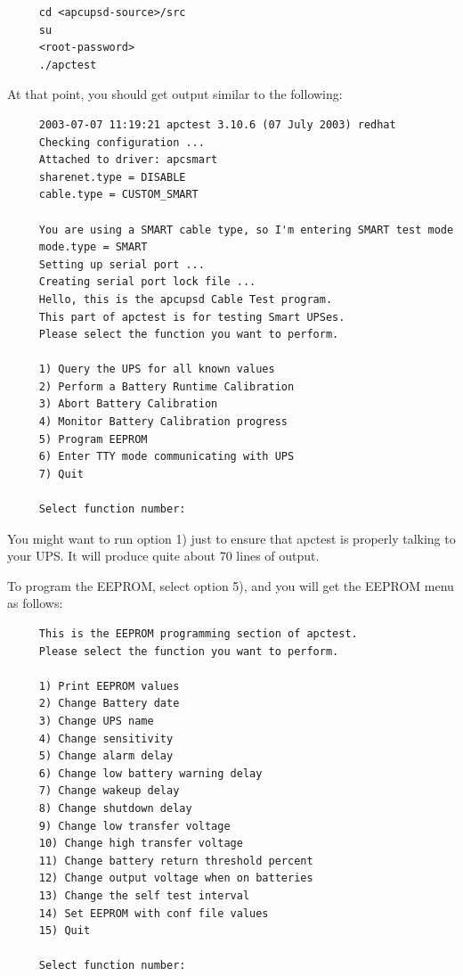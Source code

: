 {{{{{{\footnotesize
\begin{verbatim}
     cd <apcupsd-source>/src
     su
     <root-password>
     ./apctest
\end{verbatim}
\normalsize

At that point, you should get output similar to the following: 

\footnotesize
\begin{verbatim}
     2003-07-07 11:19:21 apctest 3.10.6 (07 July 2003) redhat
     Checking configuration ...
     Attached to driver: apcsmart
     sharenet.type = DISABLE
     cable.type = CUSTOM_SMART
     
     You are using a SMART cable type, so I'm entering SMART test mode
     mode.type = SMART
     Setting up serial port ...
     Creating serial port lock file ...
     Hello, this is the apcupsd Cable Test program.
     This part of apctest is for testing Smart UPSes.
     Please select the function you want to perform.
     
     1) Query the UPS for all known values
     2) Perform a Battery Runtime Calibration
     3) Abort Battery Calibration
     4) Monitor Battery Calibration progress
     5) Program EEPROM
     6) Enter TTY mode communicating with UPS
     7) Quit
     
     Select function number:
\end{verbatim}
\normalsize

You might want to run option 1) just to ensure that apctest is properly
talking to your UPS. It will produce quite about 70 lines of output.  

To program the EEPROM, select option 5), and you will get the EEPROM menu as
follows: 

\footnotesize
\begin{verbatim}
     This is the EEPROM programming section of apctest.
     Please select the function you want to perform.
     
     1) Print EEPROM values
     2) Change Battery date
     3) Change UPS name
     4) Change sensitivity
     5) Change alarm delay
     6) Change low battery warning delay
     7) Change wakeup delay
     8) Change shutdown delay
     9) Change low transfer voltage
     10) Change high transfer voltage
     11) Change battery return threshold percent
     12) Change output voltage when on batteries
     13) Change the self test interval
     14) Set EEPROM with conf file values
     15) Quit
     
     Select function number:
\end{verbatim}
\normalsize

}}}}}}
